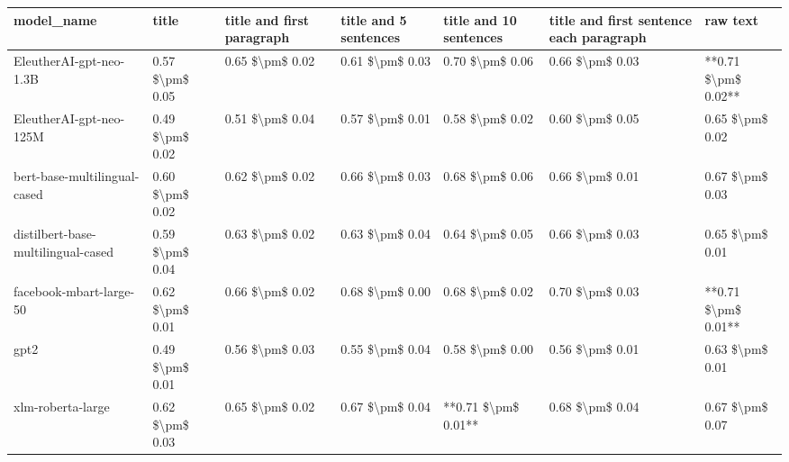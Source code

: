 \begin{tabular}{lllllll}
\toprule
                        model\_name &           title & title and first paragraph & title and 5 sentences & title and 10 sentences & title and first sentence each paragraph &            raw text \\
\midrule
           EleutherAI-gpt-neo-1.3B & 0.57 \$\textbackslash pm\$ 0.05 &           0.65 \$\textbackslash pm\$ 0.02 &       0.61 \$\textbackslash pm\$ 0.03 &        0.70 \$\textbackslash pm\$ 0.06 &                         0.66 \$\textbackslash pm\$ 0.03 & **0.71 \$\textbackslash pm\$ 0.02** \\
           EleutherAI-gpt-neo-125M & 0.49 \$\textbackslash pm\$ 0.02 &           0.51 \$\textbackslash pm\$ 0.04 &       0.57 \$\textbackslash pm\$ 0.01 &        0.58 \$\textbackslash pm\$ 0.02 &                         0.60 \$\textbackslash pm\$ 0.05 &     0.65 \$\textbackslash pm\$ 0.02 \\
      bert-base-multilingual-cased & 0.60 \$\textbackslash pm\$ 0.02 &           0.62 \$\textbackslash pm\$ 0.02 &       0.66 \$\textbackslash pm\$ 0.03 &        0.68 \$\textbackslash pm\$ 0.06 &                         0.66 \$\textbackslash pm\$ 0.01 &     0.67 \$\textbackslash pm\$ 0.03 \\
distilbert-base-multilingual-cased & 0.59 \$\textbackslash pm\$ 0.04 &           0.63 \$\textbackslash pm\$ 0.02 &       0.63 \$\textbackslash pm\$ 0.04 &        0.64 \$\textbackslash pm\$ 0.05 &                         0.66 \$\textbackslash pm\$ 0.03 &     0.65 \$\textbackslash pm\$ 0.01 \\
           facebook-mbart-large-50 & 0.62 \$\textbackslash pm\$ 0.01 &           0.66 \$\textbackslash pm\$ 0.02 &       0.68 \$\textbackslash pm\$ 0.00 &        0.68 \$\textbackslash pm\$ 0.02 &                         0.70 \$\textbackslash pm\$ 0.03 & **0.71 \$\textbackslash pm\$ 0.01** \\
                              gpt2 & 0.49 \$\textbackslash pm\$ 0.01 &           0.56 \$\textbackslash pm\$ 0.03 &       0.55 \$\textbackslash pm\$ 0.04 &        0.58 \$\textbackslash pm\$ 0.00 &                         0.56 \$\textbackslash pm\$ 0.01 &     0.63 \$\textbackslash pm\$ 0.01 \\
                 xlm-roberta-large & 0.62 \$\textbackslash pm\$ 0.03 &           0.65 \$\textbackslash pm\$ 0.02 &       0.67 \$\textbackslash pm\$ 0.04 &    **0.71 \$\textbackslash pm\$ 0.01** &                         0.68 \$\textbackslash pm\$ 0.04 &     0.67 \$\textbackslash pm\$ 0.07 \\
\bottomrule
\end{tabular}
